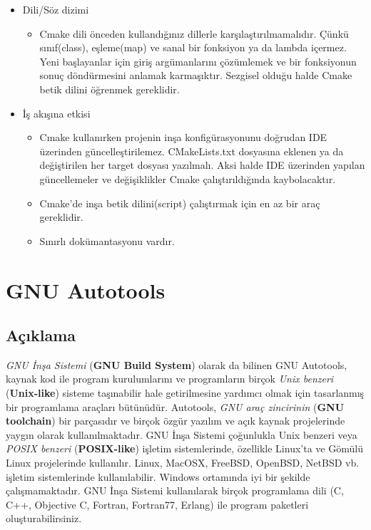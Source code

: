\documentclass[
]{book}
\providecommand{\tightlist}{%
  \setlength{\itemsep}{0pt}\setlength{\parskip}{0pt}}
\begin{document}
\begin{itemize}
\tightlist
\item
  Dili/Söz dizimi

  \begin{itemize}
  \tightlist
  \item
    Cmake dili önceden kullandığınız dillerle karşılaştırılmamalıdır. Çünkü sınıf(class), eşleme(map) ve sanal bir fonksiyon ya da lambda içermez. Yeni başlayanlar için giriş argümanlarını çözümlemek ve bir fonksiyonun sonuç döndürmesini anlamak karmaşıktır. Sezgisel olduğu halde Cmake betik dilini öğrenmek gereklidir.
  \end{itemize}
\item
  İş akışına etkisi

  \begin{itemize}
  \tightlist
  \item
    Cmake kullanırken projenin inşa konfigürasyonunu doğrudan IDE üzerinden güncelleştirilemez. CMakeLists.txt dosyasına eklenen ya da değiştirilen her target dosyası yazılmalı. Aksi halde IDE üzerinden yapılan güncellemeler ve değişiklikler Cmake çalıştırıldığında kaybolacaktır.
  \item
    Cmake'de inşa betik dilini(script) çalıştırmak için en az bir araç gereklidir.
  \item
    Sınırlı dokümantasyonu vardır.
  \end{itemize}
\end{itemize}

\hypertarget{gnu-autotools}{%
\chapter{GNU Autotools}\label{gnu-autotools}}

\hypertarget{auxe7ux131klama-1}{%
\section{Açıklama}\label{auxe7ux131klama-1}}

\emph{GNU İnşa Sistemi} (\textbf{GNU Build System}) olarak da bilinen GNU Autotools, kaynak kod ile program kurulumlarını ve programların birçok \emph{Unix benzeri} (\textbf{Unix-like}) sisteme taşınabilir hale getirilmesine yardımcı olmak için tasarlanmış bir programlama araçları bütünüdür. Autotools, \emph{GNU araç zincirinin} (\textbf{GNU toolchain}) bir parçasıdır ve birçok özgür yazılım ve açık kaynak projelerinde yaygın olarak kullanılmaktadır. GNU İnşa Sistemi çoğunlukla Unix benzeri veya \emph{POSIX benzeri} (\textbf{POSIX-like}) işletim sistemlerinde, özellikle Linux'ta ve Gömülü Linux projelerinde kullanılır. Linux, MacOSX, FreeBSD, OpenBSD, NetBSD vb. işletim sistemlerinde kullanılabilir. Windows ortamında iyi bir şekilde çalışmamaktadır. GNU İnşa Sistemi kullanılarak birçok programlama dili (C, C++, Objective C, Fortran, Fortran77, Erlang) ile program paketleri oluşturabilirsiniz.
\end{document}
